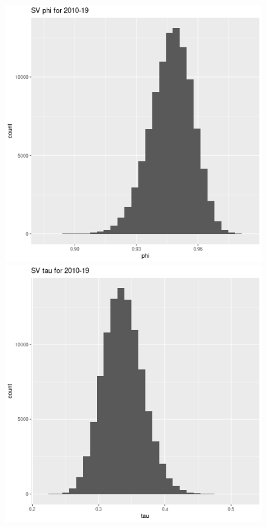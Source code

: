 \documentclass[12pt,letterpaper,reqno,fleqn]{article}
\begin{document}
\begin{figure}
\includegraphics[scale = .4]{svp1019}
\includegraphics[scale = .4]{svt1019}

\end{figure}
\end{document}
